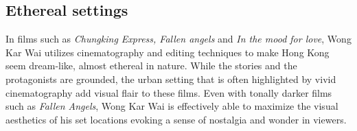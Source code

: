 \begin{multicols}{2}
\subsection{Ethereal settings}
In films such as \emph{Chungking Express, Fallen angels} and \emph{In the mood for love}, Wong Kar Wai utilizes cinematography and editing techniques to make Hong Kong seem dream-like, almost ethereal in nature. While the stories and the protagonists are grounded, the urban setting that is often highlighted by vivid cinematography add visual flair to these films. Even with tonally darker films such as \emph{Fallen Angels}, Wong Kar Wai is effectively able to maximize the visual aesthetics of his set locations evoking a sense of nostalgia and wonder in viewers.

\end{multicols}


